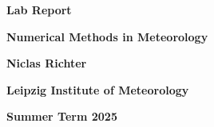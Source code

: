 \documentclass[a4paper, 12pt]{report}
\begin{document}
\begin{titlepage}
 \begin{center}
 \vspace*{2cm}
 {\Large \textbf{Lab Report}\par}%
\medskip
 {\Large \textbf{Numerical Methods in Meteorology}\par}%
\vspace{1.5cm}
{\Large \textbf{Niclas Richter}\par}%
\vspace*{6cm}
{\textbf{ Leipzig Institute of Meteorology}\par}%
\vspace*{6mm}
{\textbf{Summer Term 2025}\par}%
 \end{center}%
\end{titlepage}

\tableofcontents




\printbibliography
\end{document}
